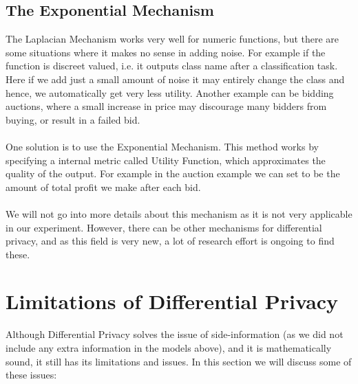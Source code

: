 \documentclass[12pt]{report}
\theoremstyle{named}
\begin{document}
\subsection{The Exponential Mechanism}
The Laplacian Mechanism works very well for numeric functions, but there are some situations where it makes no sense in adding noise. For example if the function is discreet valued, i.e. it outputs class name after a classification task. Here if we add just a small amount of noise it may entirely change the class and hence, we automatically get very less utility. Another example can be bidding auctions, where a small increase in price may discourage many bidders from buying, or result in a failed bid.
\paragraph{}
One solution is to use the Exponential Mechanism\cite{mcsherry2007mechanism}. This method works by specifying a internal metric called Utility Function, which approximates the quality of the output. For example in the auction example we can set to be the amount of total profit we make after each bid.


\paragraph{}
We will not go into more details about this mechanism as it is not very applicable in our experiment. However, there can be other mechanisms for differential privacy, and as this field is very new, a lot of research effort is ongoing to find these.

\section{Limitations of Differential Privacy}
Although Differential Privacy solves the issue of side-information (as we did not include any extra information in the models above), and it is mathematically sound, it still has its limitations and issues. In this section we will discuss some of these issues:
\end{document}
